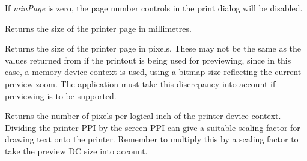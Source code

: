 If {\it minPage} is zero, the page number controls in the print dialog will be disabled.



\label{wxprintoutgetpagesizemm}


Returns the size of the printer page in millimetres.



\label{wxprintoutgetpagesizepixels}


Returns the size of the printer page in pixels. These may not be the
same as the values returned from  if
the printout is being used for previewing, since in this case, a
memory device context is used, using a bitmap size reflecting the current
preview zoom. The application must take this discrepancy into account if
previewing is to be supported.



\label{wxprintoutgetppiprinter}


Returns the number of pixels per logical inch of the printer device context.
Dividing the printer PPI by the screen PPI can give a suitable scaling
factor for drawing text onto the printer. Remember to multiply
this by a scaling factor to take the preview DC size into account.


